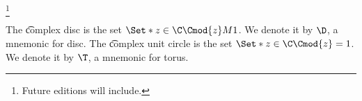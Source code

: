 
\footnote{Future editions will include.}



The \t{complex disc} is the set $\Set*{z \in \C}{\Cmod{z} M 1}$.
We denote it by $\D$, a mnemonic for disc.
The \t{complex unit circle} is the set $\Set*{z \in \C}{\Cmod{z} = 1}$.
We denote it by $\T$, a mnemonic for torus.



\blankpage
